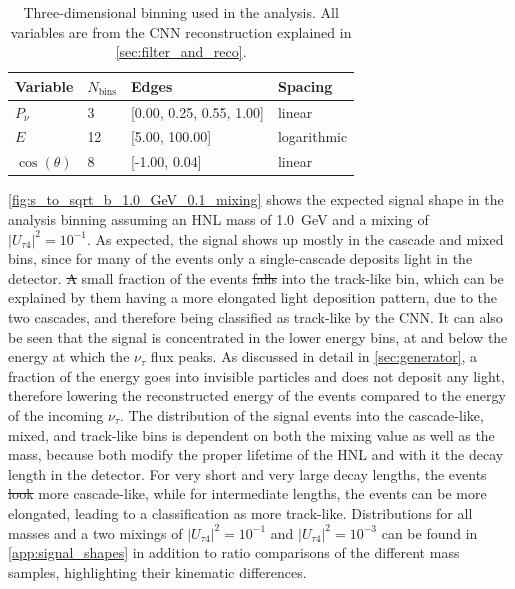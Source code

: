 \documentclass[
    aps,
    prd,
    reprint,
    amsmath,
    amssymb,
    nofootinbib,
    superscriptaddress,
    floatfix
]{revtex4-2}
\def\nomathut4{|U_{\tau4}|^2}
\renewcommand{\rm}{\mathrm}
\newcommand{\rm}{\mathrm}
\providecommand{\DIFaddtex}[1]{{\protect\color{blue}\uwave{#1}}} %
\providecommand{\DIFdeltex}[1]{{\protect\color{red}\sout{#1}}}                      %
\providecommand{\DIFaddbegin}{} %
\providecommand{\DIFaddend}{} %
\providecommand{\DIFdelbegin}{} %
\providecommand{\DIFdelend}{} %
\providecommand{\DIFadd}[1]{\texorpdfstring{\DIFaddtex{#1}}{#1}} %
\providecommand{\DIFdel}[1]{\texorpdfstring{\DIFdeltex{#1}}{}} %
\newcommand{\DIFscaledelfig}{0.5}
\newlength{\DIFdelgraphicswidth} %
\newlength{\DIFdelgraphicsheight} %
\newcommand{\DIFaddincludegraphics}[2][]{{\color{blue}\fbox{\DIFOincludegraphics[#1]{#2}}}} %
\newcommand{\DIFdelincludegraphics}[2][]{%
\sbox{\DIFdelgraphicsbox}{\DIFOincludegraphics[#1]{#2}}%
\settoboxwidth{\DIFdelgraphicswidth}{\DIFdelgraphicsbox} %
\settoboxtotalheight{\DIFdelgraphicsheight}{\DIFdelgraphicsbox} %
\scalebox{\DIFscaledelfig}{%
\parbox[b]{\DIFdelgraphicswidth}{\usebox{\DIFdelgraphicsbox}\\[-\baselineskip] \rule{\DIFdelgraphicswidth}{0em}}\llap{\resizebox{\DIFdelgraphicswidth}{\DIFdelgraphicsheight}{%
\setlength{\unitlength}{\DIFdelgraphicswidth}%
\begin{picture}(1,1)%
\thicklines\linethickness{2pt} %
{\color[rgb]{1,0,0}\put(0,0){\framebox(1,1){}}}%
{\color[rgb]{1,0,0}\put(0,0){\line( 1,1){1}}}%
{\color[rgb]{1,0,0}\put(0,1){\line(1,-1){1}}}%
\end{picture}%
}\hspace*{3pt}}} %
} %
\DeclareRobustCommand{\DIFaddbegin}{\DIFOaddbegin \let\includegraphics\DIFaddincludegraphics} %
\DeclareRobustCommand{\DIFaddend}{\DIFOaddend \let\includegraphics\DIFOincludegraphics} %
\DeclareRobustCommand{\DIFdelbegin}{\DIFOdelbegin \let\includegraphics\DIFdelincludegraphics} %
\DeclareRobustCommand{\DIFdelend}{\DIFOaddend \let\includegraphics\DIFOincludegraphics} %
\begin{document}
\begin{table}[h]
    \small
    \begin{tabular}{ llll }
    \hline\hline    
    \textbf{Variable} & \textbf{$N_\rm{bins}$} & \textbf{Edges} & \textbf{Spacing} \\     
    \hline\hline    
    $P_\nu$ & 3 & [0.00, 0.25, 0.55, 1.00] & linear \\
    $E$ & 12 & [5.00, 100.00] & logarithmic \\
    $\cos(\theta)$ & 8 & [-1.00, 0.04] & linear \\    
    \hline
\end{tabular}
\caption{Three-dimensional binning used in the analysis. All variables are from the CNN reconstruction explained in \cref{sec:filter_and_reco}.}
\label{tab:analysis_binning}
\end{table}

\cref{fig:s_to_sqrt_b_1.0_GeV_0.1_mixing} shows the expected signal shape in the analysis binning assuming an HNL mass of \SI{1.0}{\GeV} and a mixing of $\nomathut4=10^{-1}$. As expected, the signal shows up mostly in the cascade and mixed bins, since for many of the events only a single-cascade deposits light in the detector. \DIFdelbegin \DIFdel{A }\DIFdelend \DIFaddbegin \DIFadd{We see a shift of a }\DIFaddend small fraction of the events \DIFdelbegin \DIFdel{falls }\DIFdelend into the track-like bin, which can be explained by them having a more elongated light deposition pattern, due to the two cascades, and therefore being classified as track-like by the CNN. It can also be seen that the signal is concentrated in the lower energy bins, at and below the energy at which the $\nu_\tau$ flux peaks. As discussed in detail in \cref{sec:generator}, a fraction of the energy goes into invisible particles and does not deposit any light, therefore lowering the reconstructed energy of the events compared to the energy of the incoming $\nu_\tau$. The distribution of the signal events into the cascade-like, mixed, and track-like bins is dependent on both the mixing value as well as the mass, because both modify the proper lifetime of the HNL and with it the decay length in the detector. For very short and very large decay lengths, the events \DIFdelbegin \DIFdel{look }\DIFdelend \DIFaddbegin \DIFadd{are reconstructed as }\DIFaddend more cascade-like, while for intermediate lengths, the events can be more elongated, leading to a classification as more track-like. Distributions for all masses and a two mixings of $\nomathut4=10^{-1}$ and $\nomathut4=10^{-3}$ can be found in \cref{app:signal_shapes} in addition to ratio comparisons of the different mass samples, highlighting their kinematic differences.
\end{document}

